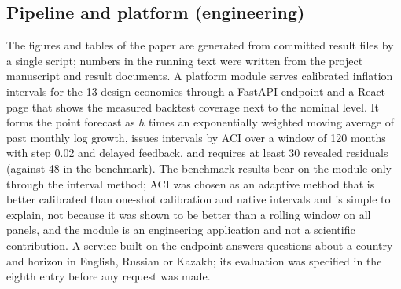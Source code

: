 \begin{table}[t]
\centering
\caption{Commodity dependence of the three panels (UNCTAD, share of commodities in merchandise exports, average 2021--2023; classification applied post hoc).}
\label{tab:commodity}
\small
{}
\end{table}

\subsection{Pipeline and platform (engineering)}\label{sec:architecture}

The figures and tables of the paper are generated from committed result files by a single script; numbers in the running text were written from the project manuscript and result documents. A platform module serves calibrated inflation intervals for the 13 design economies through a FastAPI endpoint and a React page that shows the measured backtest coverage next to the nominal level. It forms the point forecast as $h$ times an exponentially weighted moving average of past monthly log growth, issues intervals by ACI over a window of 120 months with step 0.02 and delayed feedback, and requires at least 30 revealed residuals (against 48 in the benchmark). The benchmark results bear on the module only through the interval method; ACI was chosen as an adaptive method that is better calibrated than one-shot calibration and native intervals and is simple to explain, not because it was shown to be better than a rolling window on all panels, and the module is an engineering application and not a scientific contribution. A service built on the endpoint answers questions about a country and horizon in English, Russian or Kazakh; its evaluation was specified in the eighth entry before any request was made. \ExplainerStatus{}
